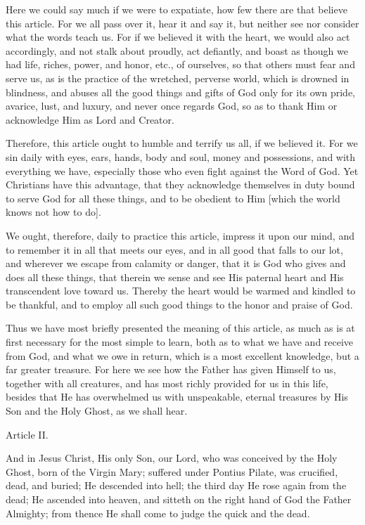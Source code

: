 Here we could say much if we were to expatiate, how few there are that
believe this article. For we all pass over it, hear it and say it, but
neither see nor consider what the words teach us. For if we believed it
with the heart, we would also act accordingly, and not stalk about
proudly, act defiantly, and boast as though we had life, riches, power,
and honor, etc., of ourselves, so that others must fear and serve us,
as is the practice of the wretched, perverse world, which is drowned in
blindness, and abuses all the good things and gifts of God only for its
own pride, avarice, lust, and luxury, and never once regards God, so
as to thank Him or acknowledge Him as Lord and Creator.

Therefore, this article ought to humble and terrify us all, if we
believed it. For we sin daily with eyes, ears, hands, body and soul,
money and possessions, and with everything we have, especially those
who even fight against the Word of God. Yet Christians have this
advantage, that they acknowledge themselves in duty bound to serve God
for all these things, and to be obedient to Him [which the world knows
not how to do].

We ought, therefore, daily to practice this article, impress it upon
our mind, and to remember it in all that meets our eyes, and in all
good that falls to our lot, and wherever we escape from calamity or
danger, that it is God who gives and does all these things, that
therein we sense and see His paternal heart and His transcendent love
toward us. Thereby the heart would be warmed and kindled to be
thankful, and to employ all such good things to the honor and praise of
God.

Thus we have most briefly presented the meaning of this article, as
much as is at first necessary for the most simple to learn, both as to
what we have and receive from God, and what we owe in return, which is
a most excellent knowledge, but a far greater treasure. For here we see
how the Father has given Himself to us, together with all creatures,
and has most richly provided for us in this life, besides that He has
overwhelmed us with unspeakable, eternal treasures by His Son and the
Holy Ghost, as we shall hear.

Article II.

And in Jesus Christ, His only Son, our Lord, who was conceived by the
Holy Ghost, born of the Virgin Mary; suffered under Pontius Pilate, was
crucified, dead, and buried; He descended into hell; the third day He
rose again from the dead; He ascended into heaven, and sitteth on the
right hand of God the Father Almighty; from thence He shall come to
judge the quick and the dead.

